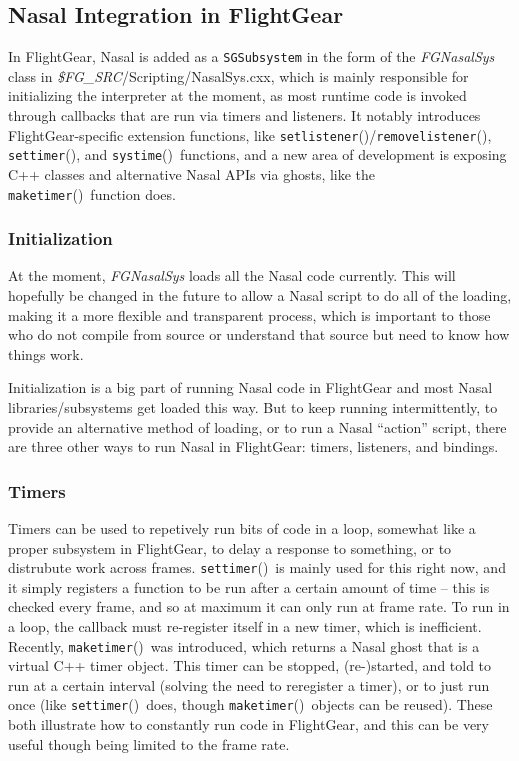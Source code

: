 \documentclass{article}
\newcommand{\name}[1]{{\it #1}}
\newcommand{\type}[1]{\textcolor{type}{\tt #1}}
\newcommand{\func}[1]{\textcolor{func}{\tt #1}}
\newcommand{\src}[1]{\textcolor{source}{\it #1}}
\newcommand{\fp}{\textcolor{func}{()}}
\begin{document}
\subsection{Nasal Integration in FlightGear}
In FlightGear, Nasal is added as a \type{SGSubsystem} in the form of the \name{FGNasalSys} class in \src{\$FG\_SRC}/Scripting/NasalSys.cxx, which is mainly responsible for initializing the interpreter at the moment, as most runtime code is invoked through callbacks that are run via timers and listeners.  It notably introduces FlightGear-specific extension functions, like \func{setlistener}\fp/\func{removelistener}\fp, \func{settimer}\fp, and \func{systime}\fp\ functions, and a new area of development is exposing C++ classes and alternative Nasal APIs via ghosts, like the \func{maketimer}\fp\ function does.

\subsubsection{Initialization}
At the moment, \name{FGNasalSys} loads all the Nasal code currently.  This will hopefully be changed in the future to allow a Nasal script to do all of the loading, making it a more flexible and transparent process, which is important to those who do not compile from source or understand that source but need to know how things work.

Initialization is a big part of running Nasal code in FlightGear and most Nasal libraries/subsystems get loaded this way.  But to keep running intermittently, to provide an alternative method of loading, or to run a Nasal ``action'' script, there are three other ways to run Nasal in FlightGear: timers, listeners, and bindings.
\subsubsection{Timers}
Timers can be used to repetively run bits of code in a loop, somewhat like a proper subsystem in FlightGear, to delay a response to something, or to distrubute work across frames.  \func{settimer}\fp\ is mainly used for this right now, and it simply registers a function to be run after a certain amount of time -- this is checked every frame, and so at maximum it can only run at frame rate.  To run in a loop, the callback must re-register itself in a new timer, which is inefficient.  Recently, \func{maketimer}\fp\ was introduced, which returns a Nasal ghost that is a virtual C++ timer object.  This timer can be stopped, (re-)started, and told to run at a certain interval (solving the need to reregister a timer), or to just run once (like \func{settimer}\fp\ does, though \func{maketimer}\fp\ objects can be reused).  These both illustrate how to constantly run code in FlightGear, and this can be very useful though being limited to the frame rate.
\end{document}
